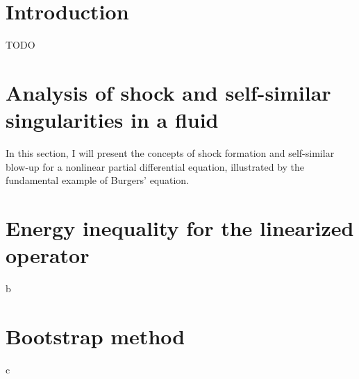 \documentclass[11pt,a4paper]{article}
\begin{document}
\section{Introduction}
TODO
\section{Analysis of shock and self-similar singularities in a fluid}
In this section, I will present the concepts of shock formation and self-similar blow-up for a nonlinear partial differential equation, illustrated by the fundamental example of Burgers' equation.




\section{Energy inequality for the linearized operator}
b
\section{Bootstrap method}
c
\end{document}
